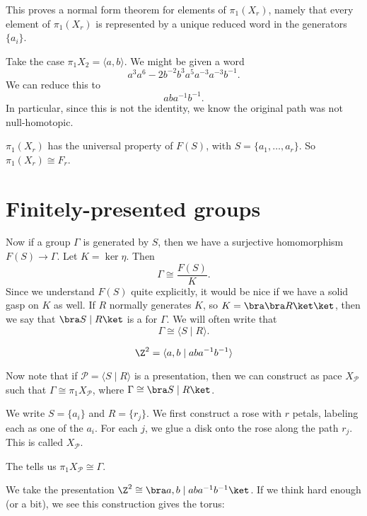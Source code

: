 \documentclass[a4paper]{article}
\begin{document}
This proves a normal form theorem for elements of $\pi_1(X_r)$, namely that every element of $\pi_1(X_r)$ is represented by a unique reduced word in the generators $\{a_i\}$.

\begin{eg}
  Take the case $\pi_1 X_2 = \langle a, b\rangle$. We might be given a word
  \[
    a^3 a^6-2 b^{-2} b^3 a^5 a^{-3} a^{-3} b^{-1}.
  \]
  We can reduce this to
  \[
    a ba^{-1}b^{-1}.
  \]
  In particular, since this is not the identity, we know the original path was not null-homotopic.
\end{eg}

\begin{cor}
  $\pi_1(X_r)$ has the universal property of $F(S)$, with $S = \{a_1, \ldots, a_r\}$. So $\pi_1(X_r) \cong F_r$.
\end{cor}

\section{Finitely-presented groups}
Now if a group $\Gamma$ is generated by $S$, then we have a surjective homomorphism $F(S) \to \Gamma$. Let $K = \ker \eta$. Then
\[
  \Gamma \cong \frac{F(S)}{K}.
\]
Since we understand $F(S)$ quite explicitly, it would be nice if we have a solid gasp on $K$ as well. If $R$ normally generates $K$, so $K = \bra\bra R\ket\ket$, then we say that $\bra S \mid R \ket$ is a  for $\Gamma$. We will often write that
\[
  \Gamma \cong \langle S \mid R \rangle.
\]
\begin{eg}
  \[
    \Z^2 = \langle a, b\mid aba^{-1}b^{-1}\rangle
  \]
\end{eg}
Now note that if $\mathcal{P} = \langle S \mid R \rangle$ is a presentation, then we can construct as pace $X_{\mathcal{P}}$ such that $\Gamma \cong \pi_1 X_{\mathcal{P}}$, where $\Gamma \cong \bra S \mid R\ket$.

We write $S = \{a_i\}$ and $R = \{r_j\}$. We first construct a rose with $r$ petals, labeling each as one of the $a_i$. For each $j$, we glue a disk onto the rose along the path $r_j$. This is called $X_{\mathcal{P}}$.

The  tells us $\pi_1 X_{\mathcal{P}} \cong \Gamma$.

\begin{eg}
  We take the presentation $\Z^2 \cong \bra a, b \mid aba^{-1}b^{-1}\ket$. If we think hard enough (or a bit), we see this construction gives the torus:


\end{eg}
\end{document}
